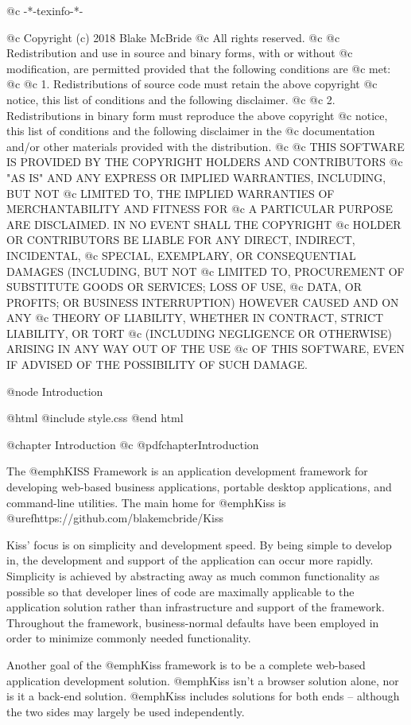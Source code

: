 @c -*-texinfo-*-

@c  Copyright (c) 2018 Blake McBride
@c  All rights reserved.
@c
@c  Redistribution and use in source and binary forms, with or without
@c  modification, are permitted provided that the following conditions are
@c  met:
@c
@c  1. Redistributions of source code must retain the above copyright
@c  notice, this list of conditions and the following disclaimer.
@c
@c  2. Redistributions in binary form must reproduce the above copyright
@c  notice, this list of conditions and the following disclaimer in the
@c  documentation and/or other materials provided with the distribution.
@c
@c  THIS SOFTWARE IS PROVIDED BY THE COPYRIGHT HOLDERS AND CONTRIBUTORS
@c  "AS IS" AND ANY EXPRESS OR IMPLIED WARRANTIES, INCLUDING, BUT NOT
@c  LIMITED TO, THE IMPLIED WARRANTIES OF MERCHANTABILITY AND FITNESS FOR
@c  A PARTICULAR PURPOSE ARE DISCLAIMED. IN NO EVENT SHALL THE COPYRIGHT
@c  HOLDER OR CONTRIBUTORS BE LIABLE FOR ANY DIRECT, INDIRECT, INCIDENTAL,
@c  SPECIAL, EXEMPLARY, OR CONSEQUENTIAL DAMAGES (INCLUDING, BUT NOT
@c  LIMITED TO, PROCUREMENT OF SUBSTITUTE GOODS OR SERVICES; LOSS OF USE,
@c  DATA, OR PROFITS; OR BUSINESS INTERRUPTION) HOWEVER CAUSED AND ON ANY
@c  THEORY OF LIABILITY, WHETHER IN CONTRACT, STRICT LIABILITY, OR TORT
@c  (INCLUDING NEGLIGENCE OR OTHERWISE) ARISING IN ANY WAY OUT OF THE USE
@c  OF THIS SOFTWARE, EVEN IF ADVISED OF THE POSSIBILITY OF SUCH DAMAGE.



@node Introduction

@html
@include style.css
@end html

@chapter Introduction
@c @pdfchapter{Introduction}

The @emph{KISS Framework} is an application development framework for
developing web-based business applications, portable desktop
applications, and command-line utilities.  The main home for
@emph{Kiss} is @uref{https://github.com/blakemcbride/Kiss}


Kiss' focus is on simplicity and development speed.  By being simple
to develop in, the development and support of the application can occur
more rapidly.  Simplicity is achieved by abstracting away as much
common functionality as possible so that developer lines of code are
maximally applicable to the application solution rather than
infrastructure and support of the framework.  Throughout the
framework, business-normal defaults have been employed in order to
minimize commonly needed functionality.

Another goal of the @emph{Kiss} framework is to be a complete web-based
application development solution.  @emph{Kiss} isn't a browser solution
alone, nor is it a back-end solution.  @emph{Kiss} includes solutions for
both ends -- although the two sides may largely be used independently.

